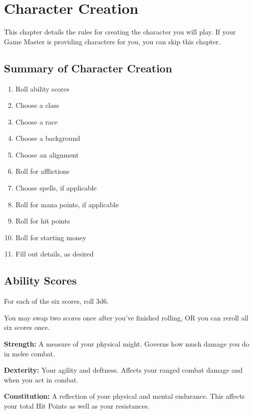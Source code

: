 \chapter{Character Creation}

\begin{multicols}{2}

This chapter details the rules for creating the character you will play.
If your Game Master is providing characters for you, you can skip this
chapter.

\section{Summary of Character Creation}

\begin{enumerate}
	\item Roll ability scores
	\item Choose a class
	\item Choose a race
	\item Choose a background
	\item Choose an alignment
	\item Roll for afflictions
	\item Choose spells, if applicable
	\item Roll for mana points, if applicable
	\item Roll for hit points
	\item Roll for starting money
	\item Fill out details, as desired
\end{enumerate}

\section{Ability Scores}

For each of the six scores, roll 3d6.

You may swap two scores once after you've finished rolling, OR you can reroll
all six scores once.

\textbf{Strength:} A measure of your physical might. Governs how much damage you
do in melee combat.

\textbf{Dexterity:} Your agility and deftness. Affects your ranged combat damage
and when you act in combat.

\textbf{Constitution:} A reflection of your physical and mental endurance. This
affects your total Hit Points as well as your resistances.


\end{multicols}
